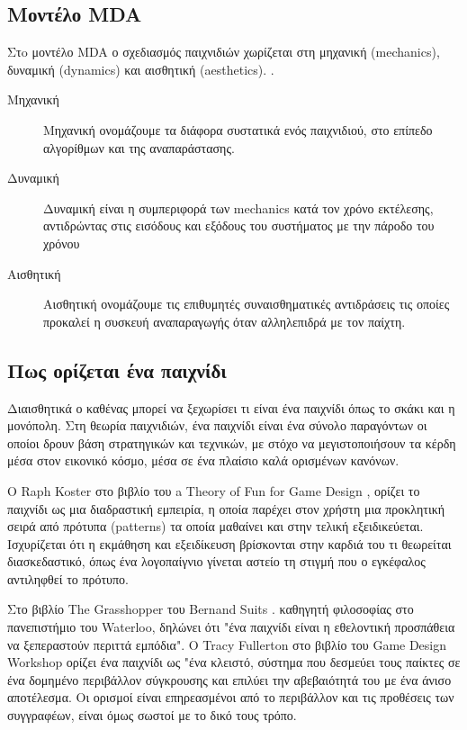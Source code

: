 	\subsection{Μοντέλο MDA}
	Στo μοντέλο \gls{MDA} ο σχεδιασμός παιχνιδιών χωρίζεται στη μηχανική (mechanics), δυναμική (dynamics) και αισθητική (aesthetics).
	\cite{mda04}.
	
	\begin{description}
	\item [Μηχανική] Μηχανική ονομάζουμε τα διάφορα συστατικά ενός παιχνιδιού, στο επίπεδο αλγορίθμων και της αναπαράστασης.
	\item [Δυναμική] Δυναμική είναι η συμπεριφορά των mechanics κατά τον χρόνο εκτέλεσης, αντιδρώντας στις εισόδους και εξόδους του συστήματος με την πάροδο του χρόνου
	\item [Αισθητική] Αισθητική ονομάζουμε τις επιθυμητές συναισθηματικές αντιδράσεις τις οποίες προκαλεί η συσκευή αναπαραγωγής όταν αλληλεπιδρά με τον παίχτη.	
	\end{description}

\subsection{Πως ορίζεται ένα παιχνίδι}
Διαισθητικά ο καθένας μπορεί να ξεχωρίσει τι είναι ένα παιχνίδι όπως το σκάκι και η μονόπολη. Στη θεωρία παιχνιδιών, ένα παιχνίδι είναι ένα σύνολο παραγόντων οι οποίοι δρουν βάση στρατηγικών και τεχνικών, με στόχο να μεγιστοποιήσουν τα κέρδη μέσα στον εικονικό κόσμο, μέσα σε ένα πλαίσιο καλά ορισμένων κανόνων.

Ο Raph Koster στο βιβλίο του a Theory of Fun for Game Design \cite{koster04}, ορίζει το παιχνίδι ως μια διαδραστική εμπειρία, η οποία παρέχει στον χρήστη μια προκλητική σειρά από πρότυπα (patterns) τα οποία μαθαίνει και στην τελική εξειδικεύεται. Ισχυρίζεται ότι η εκμάθηση και εξειδίκευση βρίσκονται στην καρδιά του τι θεωρείται διασκεδαστικό, όπως ένα λογοπαίγνιο γίνεται αστείο τη στιγμή που ο εγκέφαλος αντιληφθεί το πρότυπο.

Στο βιβλίο The Grasshopper του Bernand Suits  \cite{suits2005grasshopper}. καθηγητή φιλοσοφίας στο πανεπιστήμιο του Waterloo, δηλώνει ότι "ένα παιχνίδι είναι η εθελοντική προσπάθεια να ξεπεραστούν περιττά εμπόδια".
O Tracy Fullerton στο βιβλίο του Game Design Workshop \cite{fullerton2008game} ορίζει ένα παιχνίδι ως "ένα κλειστό, σύστημα που δεσμεύει τους παίκτες σε ένα δομημένο περιβάλλον σύγκρουσης και επιλύει την αβεβαιότητά του με ένα άνισο αποτέλεσμα. Oι ορισμοί είναι επηρεασμένοι από το περιβάλλον και τις προθέσεις των συγγραφέων, είναι όμως σωστοί με το δικό τους τρόπο.

